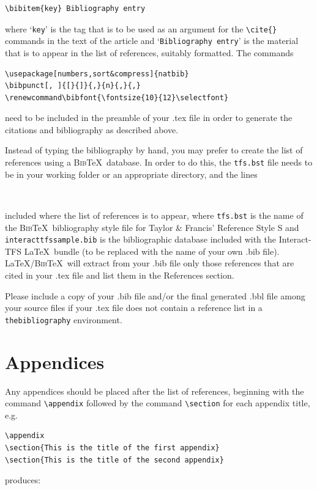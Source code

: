 \documentclass[]{interact}
\renewcommand\bibfont{\fontsize{10}{12}\selectfont}%
\theoremstyle{plain}%
\theoremstyle{definition}
\theoremstyle{remark}
\begin{document}
\begin{verbatim}
\bibitem{key} Bibliography entry
\end{verbatim}
where `\texttt{key}' is the tag that is to be used as an argument for the \verb"\cite{}" commands in the text of the article and `\texttt{Bibliography entry}' is the material that is to appear in the list of references, suitably formatted. The commands
\begin{verbatim}
\usepackage[numbers,sort&compress]{natbib}
\bibpunct[, ]{[}{]}{,}{n}{,}{,}
\renewcommand\bibfont{\fontsize{10}{12}\selectfont}
\end{verbatim}
need to be included in the preamble of your .tex file in order to generate the citations and bibliography as described above.

Instead of typing the bibliography by hand, you may prefer to create the list of references using a \textsc{Bib}\TeX\ database. In order to do this, the \texttt{tfs.bst} file needs to be in your working folder or an appropriate directory, and the lines
\begin{verbatim}


\end{verbatim}
included where the list of references is to appear, where \texttt{tfs.bst} is the name of the \textsc{Bib}\TeX\ bibliography style file for Taylor \& Francis' Reference Style S and \texttt{interacttfssample.bib} is the bibliographic database included with the \textsf{Interact}-TFS \LaTeX\ bundle (to be replaced with the name of your own .bib file). \LaTeX/\textsc{Bib}\TeX\ will extract from your .bib file only those references that are cited in your .tex file and list them in the References section.

Please include a copy of your .bib file and/or the final generated .bbl file among your source files if your .tex file does not contain a reference list in a \texttt{thebibliography} environment.


\section{Appendices}

Any appendices should be placed after the list of references, beginning with the command \verb"\appendix" followed by the command \verb"\section" for each appendix title, e.g.
\begin{verbatim}
\appendix
\section{This is the title of the first appendix}
\section{This is the title of the second appendix}
\end{verbatim}
produces:\medskip
\end{document}
